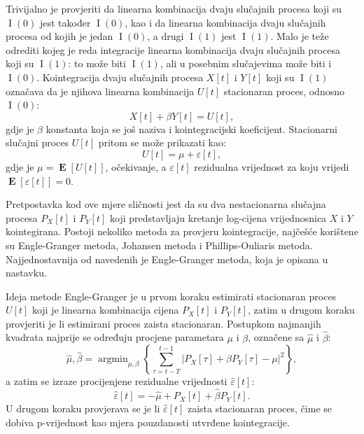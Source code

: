 \documentclass[lmodern, utf8, diplomski, numeric]{fer}
\newcommand{\E}[1]{\operatorname{\mathbf{E}}\q[#1\w]}
\newcommand{\I}[1]{\operatorname{\mathrm{I}}\q(#1\w)}
\newcommand{\q}{\left}
\newcommand{\w}{\right}
\DeclareMathOperator*{\argmin}{arg\min}
\begin{document}
  Trivijalno je provjeriti da linearna kombinacija dvaju slučajnih procesa koji su $\I{0}$ jest također $\I{0}$, kao i da linearna kombinacija dvaju slučajnih procesa od kojih je jedan $\I{0}$, a drugi $\I{1}$ jest $\I{1}$.
  Malo je teže odrediti kojeg je reda integracije linearna kombinacija dvaju slučajnih procesa koji su $\I{1}$: to može biti $\I{1}$, ali u posebnim slučajevima može biti i $\I{0}$.
  Kointegracija dvaju slučajnih procesa $X\q[t\w]$ i $Y\q[t\w]$ koji su $\I{1}$ označava da je njihova linearna kombinacija $U\q[t\w]$ stacionaran proces, odnosno $\I{0}$:
  \begin{equation}
  X\q[t\w] + \beta Y\q[t\w] = U\q[t\w],
  \end{equation}
  gdje je $\beta$ konstanta koja se još naziva i kointegracijski koeficijent.
  Stacionarni slučajni proces $U\q[t\w]$ pritom se može prikazati kao:
  \begin{equation}
  U\q[t\w] = \mu + \varepsilon\q[t\w],
  \end{equation}
  gdje je $\mu = \E{U\q[t\w]}$, očekivanje, a $\varepsilon\q[t\w]$ rezidualna vrijednost za koju vrijedi $\E{\varepsilon\q[t\w]} = 0$.
  
  Pretpostavka kod ove mjere sličnosti jest da su dva nestacionarna slučajna procesa $P_X\q[t\w]$ i $P_Y\q[t\w]$ koji predstavljaju kretanje log-cijena vrijednosnica $X$ i $Y$ kointegirana.
  Postoji nekoliko metoda za provjeru kointegracije, najčešće korištene su Engle-Granger metoda, Johansen metoda i Phillips-Ouliaris metoda.
  Najjednostavnija od navedenih je Engle-Granger metoda, koja je opisana u nastavku.
  
  Ideja metode Engle-Granger je u prvom koraku estimirati stacionaran proces $U\q[t\w]$ koji je linearna kombinacija cijena $P_X\q[t\w]$ i $P_Y\q[t\w]$, zatim u drugom koraku provjeriti je li estimirani proces zaista stacionaran.
  Postupkom najmanjih kvadrata najprije se određuju procjene parametara $\mu$ i $\beta$, označene sa $\hat{\mu}$ i $\hat{\beta}$:
  \begin{equation}
  \hat{\mu}, \hat{\beta} = \argmin_{\mu, \beta} \q\{\sum_{\tau = t - T}^{t - 1} \q \lvert P_X\q[\tau\w] + \beta P_Y\q[\tau\w] -\mu \w \rvert^2\w\},
  \end{equation}
  a zatim se izraze procijenjene rezidualne vrijednosti $\hat{\varepsilon}\q[t\w]$:
  \begin{equation}
  \hat{\varepsilon}\q[t\w] = -\hat{\mu} + P_X\q[t\w] + \hat{\beta} P_Y\q[t\w].
  \end{equation}
  U drugom koraku provjerava se je li $\hat{\varepsilon}\q[t\w]$ zaista stacionaran proces, čime se dobiva p-vrijednost kao mjera pouzdanosti utvrđene kointegracije.
  
\end{document}
